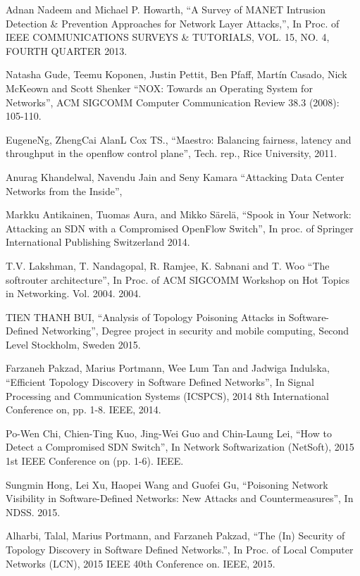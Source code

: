 \begin{thebibliography}{1}

Adnan Nadeem and Michael P. Howarth,
``A Survey of MANET Intrusion Detection \& Prevention Approaches for Network Layer Attacks,'', In Proc. of IEEE COMMUNICATIONS SURVEYS \& TUTORIALS, VOL. 15, NO. 4, FOURTH QUARTER 2013.

Natasha Gude, Teemu Koponen, Justin Pettit, Ben Pfaff, Martín Casado, Nick McKeown and Scott Shenker
``NOX: Towards an Operating System for Networks'', ACM SIGCOMM Computer Communication Review 38.3 (2008): 105-110.

EugeneNg, ZhengCai AlanL Cox TS.,
``Maestro: Balancing fairness, latency and throughput in the openflow control plane'', Tech. rep., Rice University, 2011.

Anurag Khandelwal, Navendu Jain and Seny Kamara
``Attacking Data Center Networks from the Inside'', 

Markku Antikainen, Tuomas Aura, and Mikko Särelä,
``Spook in Your Network: Attacking an SDN with a Compromised OpenFlow Switch'', In proc. of Springer International Publishing Switzerland 2014.

T.V. Lakshman, T. Nandagopal, R. Ramjee, K. Sabnani and T. Woo
``The softrouter architecture'', In Proc. of ACM SIGCOMM Workshop on Hot Topics in Networking. Vol. 2004. 2004.

TIEN THANH BUI,
``Analysis of Topology Poisoning Attacks in Software-Defined Networking'', Degree project in security and mobile computing, Second Level Stockholm, Sweden 2015.

Farzaneh Pakzad, Marius Portmann, Wee Lum Tan and Jadwiga Indulska,
``Efficient Topology Discovery in Software Defined Networks'', In Signal Processing and Communication Systems (ICSPCS), 2014 8th International Conference on, pp. 1-8. IEEE, 2014. 

Po-Wen Chi, Chien-Ting Kuo, Jing-Wei Guo and Chin-Laung Lei,
``How to Detect a Compromised SDN Switch'', In Network Softwarization (NetSoft), 2015 1st IEEE Conference on (pp. 1-6). IEEE.

Sungmin Hong, Lei Xu, Haopei Wang and Guofei Gu,
``Poisoning Network Visibility in Software-Defined Networks: New Attacks and Countermeasures'', In NDSS. 2015. 

Alharbi, Talal, Marius Portmann, and Farzaneh Pakzad,
``The (In) Security of Topology Discovery in Software Defined Networks.'', In Proc. of Local Computer Networks (LCN), 2015 IEEE 40th Conference on. IEEE, 2015.


\end{thebibliography}
